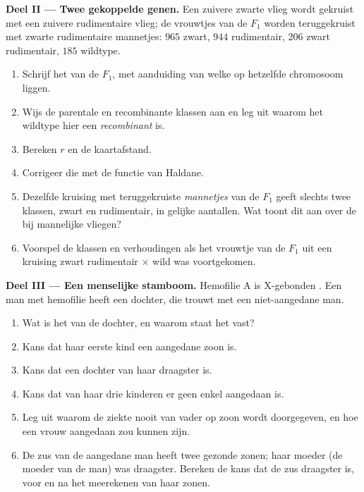 \begin{problem}
\medskip
\noindent\textbf{Deel II --- Twee gekoppelde genen.}
Een zuivere zwarte vlieg wordt gekruist met een zuivere rudimentaire vlieg;
de vrouwtjes van de $F_1$ worden teruggekruist met zwarte rudimentaire
mannetjes: $965$ zwart, $944$ rudimentair, $206$ zwart rudimentair, $185$
wildtype.
\begin{enumerate}[resume]
  \item Schrijf het  van de $F_1$, met aanduiding van welke 
        op hetzelfde chromosoom liggen.
  \item Wijs de parentale en recombinante klassen aan en leg uit
        waarom het wildtype hier een \emph{recombinant} is.
  \item Bereken $r$ en de kaartafstand.
  \item Corrigeer die met de functie van Haldane.
  \item Dezelfde kruising met teruggekruiste \emph{mannetjes} van de $F_1$
        geeft slechts twee klassen, zwart en rudimentair, in gelijke
        aantallen. Wat toont dit aan over de  bij mannelijke vliegen?
  \item Voorspel de klassen en verhoudingen als het vrouwtje van de $F_1$
        uit een kruising zwart rudimentair $\times$ wild was voortgekomen.
\end{enumerate}

\medskip
\noindent\textbf{Deel III --- Een menselijke stamboom.}
Hemofilie A is X-gebonden . Een man met hemofilie heeft een
dochter, die trouwt met een niet-aangedane man.
\begin{enumerate}[resume]
  \item Wat is het  van de dochter, en waarom staat het vast?
  \item Kans dat haar eerste kind een aangedane zoon is.
  \item Kans dat een dochter van haar draagster is.
  \item Kans dat van haar drie kinderen er geen enkel aangedaan
        is.
  \item Leg uit waarom de ziekte nooit van vader op zoon wordt
        doorgegeven, en hoe een vrouw aangedaan zou kunnen zijn.
  \item De zus van de aangedane man heeft twee gezonde zonen; haar
        moeder (de moeder van de man) was draagster. Bereken de kans
        dat de zus draagster is, voor en na het meerekenen van haar zonen.
\end{enumerate}


\end{problem}
